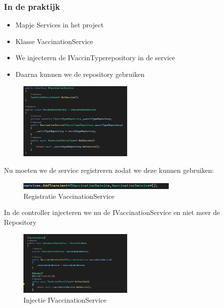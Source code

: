 \documentclass{article}
\begin{document}
\subsubsection{In de praktijk}

\begin{itemize}
    \item Mapje Services in het project
    \item Klasse VaccinationService
    \item We injecteren de IVaccinTyperepository in de service
    \item Daarna kunnen we de repository gebruiken
\end{itemize}

\begin{figure}[H]
    \centering
    \includegraphics[width=0.5\textwidth]{services-1.png}
    \caption{}
\end{figure}

Nu moeten we de service registreren zodat we deze kunnen gebruiken:

\begin{figure}[H]
    \centering
    \includegraphics[width=0.7\textwidth]{services-2.png}
    \caption{Registratie VaccinationService}
\end{figure}

In de controller injecteren we nu de IVaccinationService en niet meer de Repository

\begin{figure}[H]
    \centering
    \includegraphics[width=0.5\textwidth]{services-3.png}
    \caption{Injectie IVaccinationService}
\end{figure}
\end{document}
